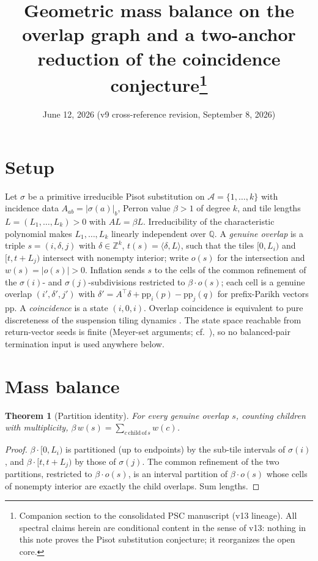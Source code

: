 \documentclass[11pt]{article}
\title{Geometric mass balance on the overlap graph and a two-anchor
reduction of the coincidence conjecture\thanks{Companion section to the
consolidated PSC manuscript (v13 lineage). All spectral claims herein are
conditional content in the sense of v13: nothing in this note proves the Pisot
substitution conjecture; it reorganizes the open core.}}
\author{}
\date{June 12, 2026 (v9 cross-reference revision, September 8, 2026)}
\newtheorem{theorem}{Theorem}[section]
\newcommand{\Z}{\mathbb{Z}}
\newcommand{\Q}{\mathbb{Q}}
\begin{document}
\maketitle

\section{Setup}

Let $\sigma$ be a primitive irreducible Pisot substitution on
$\mathcal{A}=\{1,\dots,k\}$ with incidence data $A_{ab}=|\sigma(a)|_b$,
Perron value $\beta>1$ of degree $k$, and tile lengths
$L=(L_1,\dots,L_k)>0$ with $AL=\beta L$. Irreducibility of the
characteristic polynomial makes $L_1,\dots,L_k$ linearly independent over
$\Q$. A \emph{genuine overlap} is a triple $s=(i,\delta,j)$ with
$\delta\in\Z^k$, $t(s)=\langle\delta,L\rangle$, such that the tiles
$[0,L_i)$ and $[t,t+L_j)$ intersect with nonempty interior; write
$o(s)$ for the intersection and $w(s)=|o(s)|>0$. Inflation sends $s$ to
the cells of the common refinement of the $\sigma(i)$- and
$\sigma(j)$-subdivisions restricted to $\beta\cdot o(s)$; each cell is a
genuine overlap $(i',\delta',j')$ with
$\delta'=A^{\!\top}\delta+\mathrm{pp}_i(p)-\mathrm{pp}_j(q)$ for
prefix-Parikh vectors $\mathrm{pp}$. A \emph{coincidence} is a state
$(i,0,i)$. Overlap coincidence is equivalent to pure discreteness of the
suspension tiling dynamics \cite{Sol97,AL11}. The state space reachable
from return-vector seeds is finite (Meyer-set arguments; cf.\
\cite{AL11}), so no balanced-pair termination input is used anywhere
below.

\section{Mass balance}

\begin{theorem}[Partition identity]\label{thm:partition}
For every genuine overlap $s$, counting children with multiplicity,
$\beta\,w(s)=\sum_{c\,\mathrm{child\,of}\,s}w(c)$.
\end{theorem}

\begin{proof}
$\beta\cdot[0,L_i)$ is partitioned (up to endpoints) by the sub-tile
intervals of $\sigma(i)$, and $\beta\cdot[t,t+L_j)$ by those of
$\sigma(j)$. The common refinement of the two partitions, restricted to
$\beta\cdot o(s)$, is an interval partition of $\beta\cdot o(s)$ whose
cells of nonempty interior are exactly the child overlaps. Sum lengths.
\end{proof}
\end{document}
